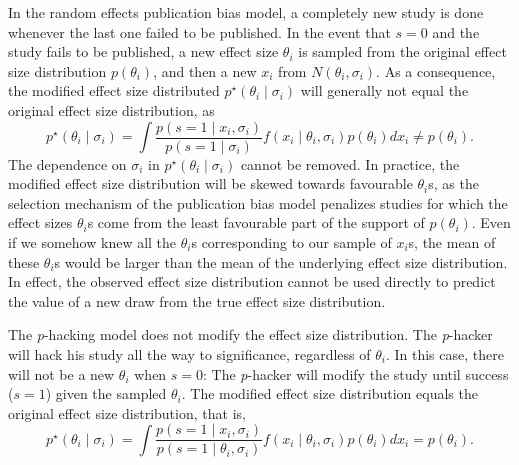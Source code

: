 \documentclass[useAMS,usenatbib,referee]{biom}
\begin{document}
In the random effects publication bias model, a completely new study is done whenever the last one failed to be published. In the event that $s=0$ and the study fails to be published, a new effect size $\theta_i$ is sampled from the original effect size distribution $p(\theta_i)$, and then a new $x_i$ from $N(\theta_i,\sigma_i)$. As a consequence, the modified effect size distributed $p^\star(\theta_i\mid \sigma_i)$ will generally not equal the original effect size distribution, as
\[
p^\star(\theta_i\mid \sigma_i)=\int\frac{p(s=1\mid x_i, \sigma_i)}{p(s=1\mid\sigma_i)}f(x_i \mid \theta_i, \sigma _i) p(\theta_i) dx_i\neq p(\theta_i).
\]
The dependence on $\sigma_i$ in $p^\star(\theta_i\mid \sigma_i)$ cannot be removed. In practice, the modified effect size distribution will be skewed towards favourable $\theta_i$s, as the selection mechanism of the publication bias model penalizes studies for which the effect sizes $\theta_i$s come from the least favourable part of the support of $p(\theta_i)$. Even if we somehow knew all the $\theta_i$s corresponding to our sample of $x_i$s, the mean of these $\theta_i$s would be larger than the mean of the underlying effect size distribution. In effect, the observed effect size distribution cannot be used directly to predict the value of a new draw from the true effect size distribution.



The \textit{p}-hacking model does not modify the effect size distribution. The \textit{p}-hacker will hack his study all the way to significance, regardless of $\theta_i$. In this case, there will not be a new $\theta_i$ when $s=0$: The \textit{p}-hacker will modify the study until success ($s=1$) given the sampled $\theta_i$. The modified effect size distribution equals the original effect size distribution, that is, 
\[
p^\star(\theta_i\mid \sigma_i)=\int\frac{p(s=1\mid x_i, \sigma_i)}{p(s=1\mid \theta_i, \sigma_i)}f(x_i \mid \theta_i, \sigma _i) p(\theta_i)dx_i = p(\theta_i).
\]
\end{document}

